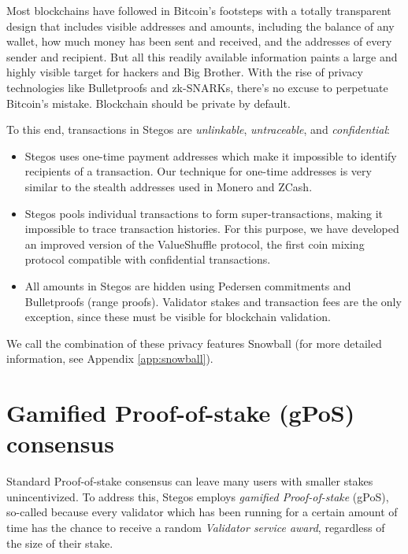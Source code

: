 \documentclass[8pt,fleqn,openany]{book}
\begin{document}
Most blockchains have followed in Bitcoin’s footsteps with a totally transparent design that includes visible addresses and amounts, including the balance of any wallet, how much money has been sent and received, and the addresses of every sender and recipient. But all this readily available information paints a large and highly visible target for hackers and Big Brother. With the rise of privacy technologies like Bulletproofs and zk-SNARKs, there’s no excuse to perpetuate Bitcoin’s mistake. Blockchain should be private by default.

To this end, transactions in Stegos are \textit{unlinkable}, \textit{untraceable}, and \textit{confidential}:

\begin{itemize}
	\item Stegos uses one-time payment addresses which make it impossible to identify recipients of a transaction. Our technique for one-time addresses is very similar to the stealth addresses used in Monero and ZCash.
	\item Stegos pools individual transactions to form super-transactions, making it impossible to trace transaction histories. For this purpose, we have developed an improved version of the ValueShuffle protocol\cite{c7}, the first coin mixing protocol compatible with confidential transactions.
	\item All amounts in Stegos are hidden using Pedersen commitments\cite{c8} and Bulletproofs (range proofs)\cite{c4}. Validator stakes and transaction fees are the only exception, since these must be visible for blockchain validation.\end{itemize}

We call the combination of these privacy features Snowball (for more detailed information, see Appendix \ref{app:snowball}). %

\section{Gamified Proof-of-stake (gPoS) consensus}

Standard Proof-of-stake consensus can leave many users with smaller stakes unincentivized. To address this, Stegos employs \textit{gamified Proof-of-stake} (gPoS), so-called because every validator which has been running for a certain amount of time has the chance to receive a random \textit{Validator service award}, regardless of the size of their stake\footnotemark.

\end{document}
